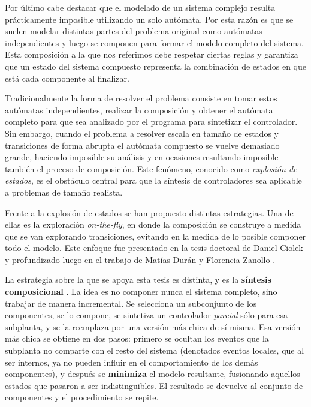 Por último cabe destacar que el modelado de un sistema complejo resulta prácticamente imposible utilizando un solo autómata. Por esta razón es que se suelen modelar distintas partes del problema original como autómatas independientes y luego se componen para formar el modelo completo del sistema. Esta composición a la que nos referimos debe respetar ciertas reglas y garantiza que un estado del sistema compuesto representa la combinación de estados en que está cada componente al finalizar.

Tradicionalmente la forma de resolver el problema consiste en tomar estos autómatas independientes, realizar la composición y obtener el autómata completo para que sea analizado por el programa para sintetizar el controlador. Sin embargo, cuando el problema a resolver escala en tamaño de estados y transiciones de forma abrupta el autómata compuesto se vuelve demasiado grande, haciendo imposible su análisis y en ocasiones resultando imposible también el proceso de composición. Este fenómeno, conocido como \textit{explosión de estados}, es el obstáculo central para que la síntesis de controladores sea aplicable a problemas de tamaño realista.

Frente a la explosión de estados se han propuesto distintas estrategias. Una de ellas es la exploración \textit{on-the-fly}, en donde la composición se construye a medida que se van explorando transiciones, evitando en la medida de lo posible componer todo el modelo. Este enfoque fue presentado en la tesis doctoral de Daniel Ciolek \cite{Ciolek} y profundizado luego en el trabajo de Matías Durán y Florencia Zanollo \cite{DuranZanollo, paperOTF}.

La estrategia sobre la que se apoya esta tesis es distinta, y es la \textbf{síntesis composicional} \cite{compositional}. La idea es no componer nunca el sistema completo, sino trabajar de manera incremental. Se selecciona un subconjunto de los componentes, se lo compone, se sintetiza un controlador \textit{parcial} sólo para esa subplanta, y se la reemplaza por una versión más chica de sí misma. Esa versión más chica se obtiene en dos pasos: primero se ocultan los eventos que la subplanta no comparte con el resto del sistema (denotados eventos locales, que al ser internos, ya no pueden influir en el comportamiento de los demás componentes), y después se \textbf{minimiza} el modelo resultante, fusionando aquellos estados que pasaron a ser indistinguibles. El resultado se devuelve al conjunto de componentes y el procedimiento se repite.


